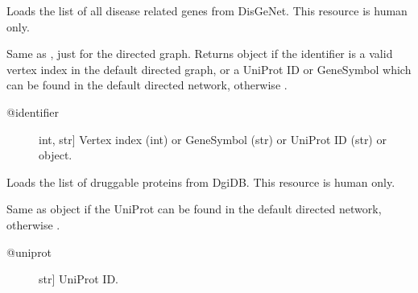 \documentclass[letterpaper,10pt,english]{sphinxmanual}
\begin{document}
\begin{fulllineitems}
\begin{fulllineitems}
\begin{description}
\end{description}

\end{fulllineitems}


\begin{fulllineitems}
\label{\detokenize{main:pypath.main.PyPath.disease_genes_list}}
Loads the list of all disease related genes from DisGeNet.
This resource is human only.

\end{fulllineitems}


\begin{fulllineitems}
\label{\detokenize{main:pypath.main.PyPath.dp}}
Same as , just for the directed graph.
Returns  object if the identifier
is a valid vertex index in the default directed graph,
or a UniProt ID or GeneSymbol which can be found in the
default directed network, otherwise .
\begin{description}
\item[{@identifier}] \leavevmode{[}int, str{]}
Vertex index (int) or GeneSymbol (str) or UniProt ID (str) or
 object.

\end{description}

\end{fulllineitems}


\begin{fulllineitems}
\label{\detokenize{main:pypath.main.PyPath.druggability_list}}
Loads the list of druggable proteins from DgiDB.
This resource is human only.

\end{fulllineitems}


\begin{fulllineitems}
\label{\detokenize{main:pypath.main.PyPath.duniprot}}
Same as  object if the UniProt
can be found in the default directed network,
otherwise .
\begin{description}
\item[{@uniprot}] \leavevmode{[}str{]}
UniProt ID.


\end{description}
\end{fulllineitems}
\end{fulllineitems}
\end{document}
